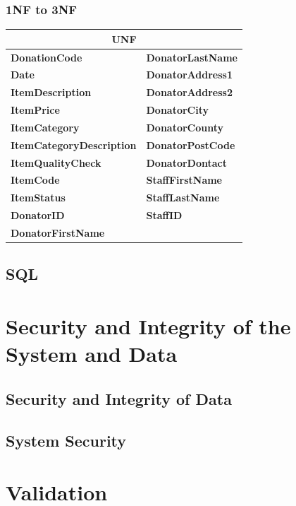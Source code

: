 \subsubsection{1NF to 3NF}
\begin{center}
    \begin{tabular}{|p{4cm}|p{4cm}|}
	\hline
	\multicolumn{2}{|c|}{UNF} \\
	\hline
	\textbf{DonationCode} & \textbf{DonatorLastName} \\ \hline
	\textbf{Date} & \textbf{DonatorAddress1} \\ \hline
	\textbf{ItemDescription} & \textbf{DonatorAddress2} \\ \hline
	\textbf{ItemPrice} & \textbf{DonatorCity} \\ \hline
	\textbf{ItemCategory} & \textbf{DonatorCounty} \\ \hline
	\textbf{ItemCategoryDescription} & \textbf{DonatorPostCode} \\ \hline
	\textbf{ItemQualityCheck} & \textbf{DonatorDontact} \\ \hline
	\textbf{ItemCode} & \textbf{StaffFirstName} \\ \hline
	\textbf{ItemStatus} & \textbf{StaffLastName} \\ \hline
	\textbf{DonatorID} & \textbf{StaffID} \\ \hline
	\textbf{DonatorFirstName} \\ \hline
    \end{tabular}
\end{center}
	

\subsection{SQL}

\section{Security and Integrity of the System and Data}

\subsection{Security and Integrity of Data}

\subsection{System Security}

\section{Validation}

